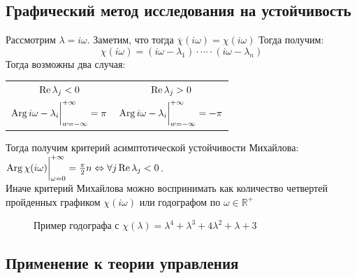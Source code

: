 \subsection{Графический метод исследования на устойчивость} 
Рассмотрим $\lambda = i \omega$. Заметим, что тогда $\overline{\chi}(i\omega) = \chi(i\omega)$
Тогда получим:
\begin{equation*}
\chi(i \omega) = (i \omega - \lambda_1)\cdot \cdots \cdot (i \omega - \lambda_n)
\end{equation*}
Тогда возможны два случая: \\
\begin{center}
	\begin{tabular}{cc}
		$\operatorname{Re}{\lambda_j} < 0$ & $\operatorname{Re}{\lambda_j} > 0$\\
		$\operatorname{Arg}{i \omega - \lambda_i} \bigg|_{w = - \infty}^{+\infty}\bigg.	= \pi$ & $\operatorname{Arg}{i \omega - \lambda_i} \bigg|_{w = - \infty}^{+\infty}\bigg.	= -\pi$
	\end{tabular}
\end{center}
Тогда получим критерий асимптотической устойчивости Михайлова:\\
$\operatorname{Arg}{\chi(i \omega)}\bigg|_{\omega = 0}^{+\infty} = \frac{\pi}{2} n \Leftrightarrow \forall j \operatorname{Re}{\lambda_j} < 0$.\\
Иначе критерий Михайлова можно воспринимать как количество четвертей пройденных графиком $\chi(i\omega)$ или годографом по $\omega \in \mathbb{R}^+$ 
\begin{figure}[H]
	\caption{ Пример годографа с $\chi(\lambda) = \lambda^4+\lambda^3+4\lambda^2+\lambda+3$}
\end{figure}
\subsection{Применение к теории управления}
